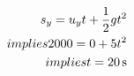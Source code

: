 \documentclass[preview]{standalone}
\begin{document}
\begin{align*}
\special{dvisvgm:raw <g id='unique000'>}s_y = u_y t + \frac{1}{2} g t^2 \\implies 2000 = 0 + 5t^2 \\implies t = 20\,\mathrm{s}\special{dvisvgm:raw </g>}
\end{align*}
\end{document}

